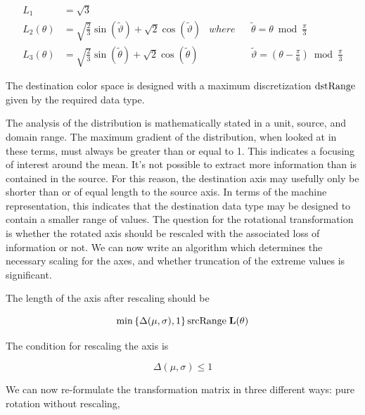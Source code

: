 \begin{align}\label{eq:L2}
L_1 &= \sqrt{3} \\
L_2(\theta)  &= \sqrt{\frac{2}{3}} \sin \left(\widetilde{\vartheta}\right) + \sqrt{2} \cos \left(\widetilde{\vartheta}\right)  & where & & \widetilde{\theta} = \theta  \bmod \frac{\pi }{3} \\
L_3(\theta)  &= \sqrt{\frac{2}{3}} \sin \left(\widetilde{\theta}\right) + \sqrt{2} \cos \left(\widetilde{\theta}\right) & & & \widetilde{\vartheta} = \left(\theta - \frac{\pi }{6}\right) \bmod \frac{\pi }{3}
\end{align}

The destination color space is designed with a maximum discretization $\text{dstRange}$ given by the required data type.

The analysis of the distribution is mathematically stated in a unit, source, and domain range. The maximum gradient of the distribution, when looked at in these terms, must always be greater than or equal to 1. This indicates a focusing of interest around the mean. It's not possible to extract more information than is contained in the source. For this reason, the destination axis may usefully only be shorter than or of equal length to the source axis. In terms of the machine representation, this indicates that the destination data type may be designed to contain a smaller range of values. The question for the rotational transformation is whether the rotated axis should be rescaled with the associated loss of information or not. We can now write an algorithm which determines the necessary scaling for the axes, and whether truncation of the extreme values is significant.

The length of the axis after rescaling should be

\begin{equation}\label{eq:RescaleAxis}
\min\left\{ \Delta(\mu,\sigma) , 1\right\} \text{srcRange} \; \mathbf{L}(\theta)
\end{equation}

The condition for rescaling the axis is

\begin{equation}\label{eq:RescaleAxisCondition}
\Delta(\mu,\sigma) \le 1
\end{equation}

We can now re-formulate the transformation matrix in three different ways: pure rotation without rescaling, 

